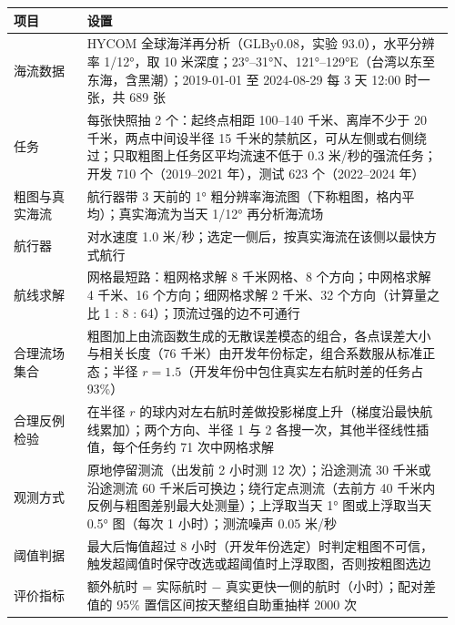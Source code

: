 \begin{tabular}{@{}p{0.16\linewidth}p{0.80\linewidth}@{}}
\toprule
项目 & 设置 \\
\midrule
海流数据 & HYCOM 全球海洋再分析（GLBy0.08，实验 93.0），水平分辨率 1/12°，取 10 米深度；23°--31°N、121°--129°E（台湾以东至东海，含黑潮）；2019-01-01 至 2024-08-29 每 3 天 12:00 时一张，共 689 张 \\
任务 & 每张快照抽 2 个：起终点相距 100--140 千米、离岸不少于 20 千米，两点中间设半径 15 千米的禁航区，可从左侧或右侧绕过；只取粗图上任务区平均流速不低于 0.3 米/秒的强流任务；开发 710 个（2019--2021 年），测试 623 个（2022--2024 年） \\
粗图与真实海流 & 航行器带 3 天前的 1° 粗分辨率海流图（下称粗图，格内平均）；真实海流为当天 1/12° 再分析海流场 \\
航行器 & 对水速度 1.0 米/秒；选定一侧后，按真实海流在该侧以最快方式航行 \\
航线求解 & 网格最短路：粗网格求解 8 千米网格、8 个方向；中网格求解 4 千米、16 个方向；细网格求解 2 千米、32 个方向（计算量之比 1 : 8 : 64）；顶流过强的边不可通行 \\
合理流场集合 & 粗图加上由流函数生成的无散误差模态的组合，各点误差大小与相关长度（76 千米）由开发年份标定，组合系数服从标准正态；半径 $r=1.5$（开发年份中包住真实左右航时差的任务占 93\%） \\
合理反例检验 & 在半径 $r$ 的球内对左右航时差做投影梯度上升（梯度沿最快航线累加）；两个方向、半径 1 与 2 各搜一次，其他半径线性插值，每个任务约 71 次中网格求解 \\
观测方式 & 原地停留测流（出发前 2 小时测 12 次）；沿途测流 30 千米或沿途测流 60 千米后可换边；绕行定点测流（去前方 40 千米内反例与粗图差别最大处测量）；上浮取当天 1° 图或上浮取当天 0.5° 图（每次 1 小时）；测流噪声 0.05 米/秒 \\
阈值判据 & 最大后悔值超过 8 小时（开发年份选定）时判定粗图不可信，触发超阈值时保守改选或超阈值时上浮取图，否则按粗图选边 \\
评价指标 & 额外航时 = 实际航时 $-$ 真实更快一侧的航时（小时）；配对差值的 95\% 置信区间按天整组自助重抽样 2000 次 \\
\bottomrule
\end{tabular}
